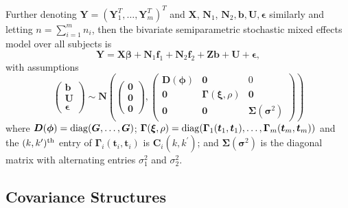 \documentclass[review]{elsarticle}
\begin{document}
Further denoting $\boldsymbol  Y = (\boldsymbol Y_1^T, \dots, \boldsymbol Y_m^T)^T$ and $\boldsymbol  X$, $\boldsymbol  N_1$, $\boldsymbol  N_2, \boldsymbol b, \boldsymbol U, \boldsymbol \epsilon$ similarly and letting $n = \sum_{i = 1}^m n_i$, then  the bivariate semiparametric stochastic mixed effects model over all subjects is 
\begin{equation} \label{propM}
\boldsymbol Y 
=
\boldsymbol{X}\boldsymbol{\beta} 
+ \boldsymbol N_1 \boldsymbol f_1 
+ \boldsymbol N_2 \boldsymbol f_2 
+ \boldsymbol{Z}\boldsymbol{b}
+ \boldsymbol U 
+ \boldsymbol \epsilon,
\end{equation}
with assumptions 
\[
 \begin{pmatrix}
  \boldsymbol b \\
  \boldsymbol U  \\
 \boldsymbol \epsilon
 \end{pmatrix}
 \sim 
 \boldsymbol N \left(
 \begin{pmatrix}
\boldsymbol 0 \\
\boldsymbol 0 \\
 \boldsymbol 0 
 \end{pmatrix},
  \begin{pmatrix}
  \boldsymbol D(\boldsymbol \phi) &  \boldsymbol 0 & 0 \\
  \boldsymbol 0 & \boldsymbol \Gamma (\boldsymbol \xi, \rho) & \boldsymbol 0 \\
 \boldsymbol 0 & \boldsymbol 0 &  \boldsymbol \Sigma (\boldsymbol \sigma^2) 
 \end{pmatrix}
 \right) 
\]
where 
$\boldsymbol D (\boldsymbol \phi) = {\rm diag} (\boldsymbol G, \dots, \boldsymbol G)$; 
$\boldsymbol \Gamma (\boldsymbol \xi, \rho) = {\rm diag} (  \boldsymbol \Gamma_1 (\boldsymbol t_1, \boldsymbol t_1), \dots,   \boldsymbol \Gamma_m(\boldsymbol t_m, \boldsymbol t_m))$
and the $(k, k^\prime)^{\rm th}$ entry of $ \boldsymbol \Gamma_i(\boldsymbol t_i, \boldsymbol t_i)$ is $\boldsymbol C_i(k, k^\prime)$;
and $\bm \Sigma(\bm \sigma^2)$ is the diagonal matrix with alternating entries $\sigma^2_1$ and $\sigma^2_2$. 

\subsection{Covariance Structures} \label{bivRes}
\end{document}
